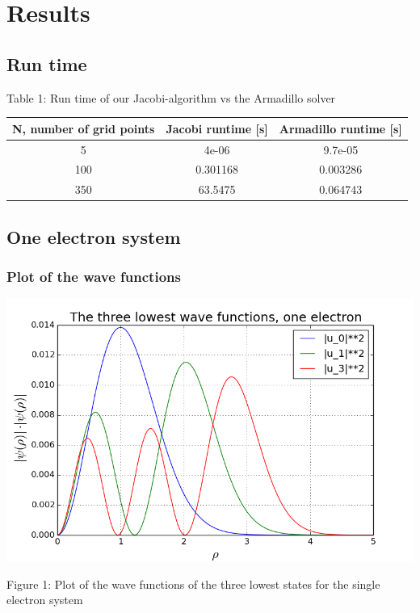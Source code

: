 \documentclass[norsk,a4paper,12pt]{article}
\begin{document}
\section{Results}

\subsection{Run time}
\par
\vspace{3mm}

Table 1: Run time of our Jacobi-algorithm vs the Armadillo solver\par
\vspace{3mm}

\begin{tabular}{|c|c|c|}\hline
     {\bf N, number of grid points} & {\bf Jacobi runtime [s]} & {\bf Armadillo runtime [s]}\\ \hline
     5 & 4e-06 & 9.7e-05\\
     100 & 0.301168 & 0.003286 \\
     350 & 63.5475& 0.064743  \\ \hline
  
\end{tabular}\par

\subsection{One electron system}\par
\vspace{3mm}

\subsubsection{Plot of the wave functions}

\includegraphics[scale=0.6]{wavefunc_one}\par
Figure 1: Plot of the wave functions of the three lowest states for the single electron system
\par
\vspace{5mm}
\end{document}
